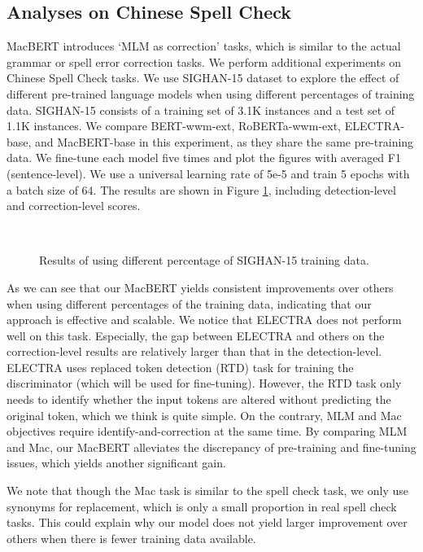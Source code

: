 \documentclass[journal]{IEEEtran}
\begin{document}
\begin{CJK*}{UTF8}{gbsn}
\subsection{Analyses on Chinese Spell Check}
MacBERT introduces `MLM as correction' tasks, which is similar to the actual grammar or spell error correction tasks.
We perform additional experiments on Chinese Spell Check tasks. 
We use SIGHAN-15 \cite{tseng-etal-2015-introduction} dataset to explore the effect of different pre-trained language models when using different percentages of training data. 
SIGHAN-15 consists of a training set of 3.1K instances and a test set of 1.1K instances.
We compare BERT-wwm-ext, RoBERTa-wwm-ext, ELECTRA-base, and MacBERT-base in this experiment, as they share the same pre-training data.
We fine-tune each model five times and plot the figures with averaged F1 (sentence-level).
We use a universal learning rate of 5e-5 and train 5 epochs with a batch size of 64.
The results are shown in Figure \ref{sighan-analysis}, including detection-level and correction-level scores.

\begin{figure}[htp]
  \centering
   \\
   \caption{\label{sighan-analysis} Results of using different percentage of SIGHAN-15 training data.}
\end{figure}

As we can see that our MacBERT yields consistent improvements over others when using different percentages of the training data, indicating that our approach is effective and scalable.
We notice that ELECTRA does not perform well on this task.
Especially, the gap between ELECTRA and others on the correction-level results are relatively larger than that in the detection-level.
ELECTRA uses replaced token detection (RTD) task for training the discriminator (which will be used for fine-tuning).
However, the RTD task only needs to identify whether the input tokens are altered without predicting the original token, which we think is quite simple.
On the contrary, MLM and Mac objectives require identify-and-correction at the same time.
By comparing MLM and Mac, our MacBERT alleviates the discrepancy of pre-training and fine-tuning issues, which yields another significant gain.

We note that though the Mac task is similar to the spell check task, we only use synonyms for replacement, which is only a small proportion in real spell check tasks. 
This could explain why our model does not yield larger improvement over others when there is fewer training data available.



\end{CJK*}
\end{document}
